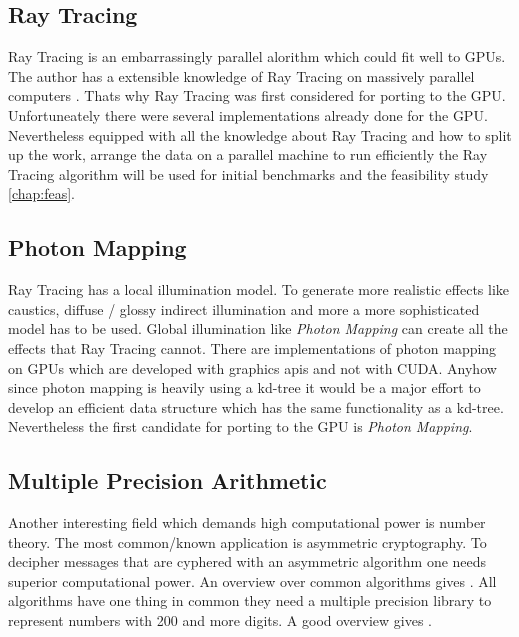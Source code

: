 \subsection{Ray Tracing} %
\label{par:ray_tracing}
Ray Tracing \citep{citeulike:841961} is an embarrassingly parallel alorithm which
could fit well to GPUs. The author has a extensible knowledge of Ray Tracing on
massively parallel computers \citep{citeulike:80546}. Thats why Ray Tracing was
first considered for porting to the GPU. Unfortuneately there were several
implementations already done for the GPU. Nevertheless equipped with all the
knowledge about Ray Tracing and how to split up the work, arrange the data on a
parallel machine to run efficiently the Ray Tracing algorithm
\citep{citeulike:3770900} will be used for initial benchmarks and the feasibility
study \autoref{chap:feas}.

\subsection{Photon Mapping} %
\label{par:photon_mapping}
Ray Tracing has a local illumination model. To generate more realistic effects
like caustics, diffuse / glossy indirect illumination and more a more
sophisticated model has to be used. Global illumination like \emph{Photon
Mapping} \citep{citeulike:635695} can create all the effects that Ray Tracing
cannot. There are implementations of photon mapping on GPUs
\citep{Purcell:2003:PMO} which are developed with graphics apis and not with
CUDA. Anyhow since photon mapping is heavily using a kd-tree it would be a major
effort to develop an efficient data structure which has the same functionality
as a kd-tree. Nevertheless the first candidate for porting to the \gls{GPU} is \emph{Photon Mapping}.

\subsection{Multiple Precision Arithmetic} %
\label{par:multiple_precision_arithmetic}
Another interesting field which demands high computational power is number
theory. The most common/known application is asymmetric cryptography. To
decipher messages that are cyphered with an asymmetric algorithm one needs
superior computational power. An overview over common algorithms gives
\citep{citeulike:3783254}. All algorithms have one thing in common they need a
multiple precision library to represent numbers with 200 and more digits. A good
overview gives \citep{citeulike:3783244}.

